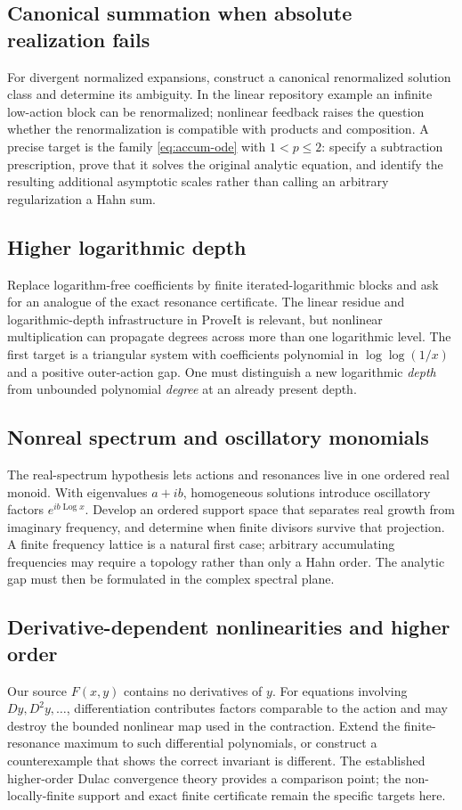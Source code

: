 \documentclass[11pt,a4paper]{article}
\numberwithin{equation}{section}
\theoremstyle{definition}
\theoremstyle{remark}
\newcommand{\Log}{\operatorname{Log}}
\begin{document}
\subsection{Canonical summation when absolute realization fails}
For divergent normalized expansions, construct a canonical
renormalized solution class and determine its ambiguity. In the
linear repository example an infinite low-action block can be
renormalized; nonlinear feedback raises the question whether the
renormalization is compatible with products and composition.
A precise target is the family \eqref{eq:accum-ode} with
\(1<p\le2\): specify a subtraction prescription, prove that it
solves the original analytic equation, and identify the resulting
additional asymptotic scales rather than calling an arbitrary
regularization a Hahn sum.

\subsection{Higher logarithmic depth}
Replace logarithm-free coefficients by finite iterated-logarithmic
blocks and ask for an analogue of the exact resonance certificate.
The linear residue and logarithmic-depth infrastructure in ProveIt
is relevant, but nonlinear multiplication can propagate degrees
across more than one logarithmic level. The first target is a
triangular system with coefficients polynomial in \(\log\log(1/x)\)
and a positive outer-action gap. One must distinguish a new
logarithmic \emph{depth} from unbounded polynomial \emph{degree} at
an already present depth.

\subsection{Nonreal spectrum and oscillatory monomials}
The real-spectrum hypothesis lets actions and resonances live in
one ordered real monoid. With eigenvalues \(a+ib\), homogeneous
solutions introduce oscillatory factors \(e^{ib\Log x}\). Develop
an ordered support space that separates real growth from imaginary
frequency, and determine when finite divisors survive that
projection. A finite frequency lattice is a natural first case;
arbitrary accumulating frequencies may require a topology rather
than only a Hahn order. The analytic gap must then be formulated in
the complex spectral plane.

\subsection{Derivative-dependent nonlinearities and higher order}
Our source \(F(x,y)\) contains no derivatives of \(y\). For equations
involving \(Dy,D^2y,\ldots\), differentiation contributes factors
comparable to the action and may destroy the bounded nonlinear map
used in the contraction. Extend the finite-resonance maximum to
such differential polynomials, or construct a counterexample that
shows the correct invariant is different. The established
higher-order Dulac convergence theory provides a comparison point;
the non-locally-finite support and exact finite certificate remain
the specific targets here.
\end{document}
